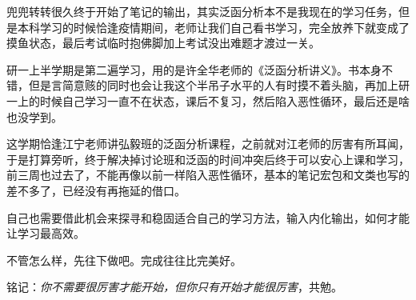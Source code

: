 \documentclass{../xdyy-notes}
\begin{document}
\maketitle

\frontmatter

\begin{preface}
  兜兜转转很久终于开始了笔记的输出，其实泛函分析本不是我现在的学习任务，但是本科学习的时候恰逢疫情期间，老师让我们自己看书学习，完全放养下就变成了摸鱼状态，最后考试临时抱佛脚加上考试没出难题才渡过一关。

  研一上半学期是第二遍学习，用的是许全华老师的《泛函分析讲义》。书本身不错，但是言简意赅的同时也会让我这个半吊子水平的人有时摸不着头脑，再加上研一上的时候自己学习一直不在状态，课后不复习，然后陷入恶性循环，最后还是啥也没学到。

  这学期恰逢江宁老师讲弘毅班的泛函分析课程，之前就对江老师的厉害有所耳闻，于是打算旁听，终于解决掉讨论班和泛函的时间冲突后终于可以安心上课和学习，前三周也过去了，不能再像以前一样陷入恶性循环，基本的笔记宏包和文类也写的差不多了，已经没有再拖延的借口。

  自己也需要借此机会来探寻和稳固适合自己的学习方法，输入内化输出，如何才能让学习最高效。

  不管怎么样，先往下做吧。完成往往比完美好。

  铭记：\emph{你不需要很厉害才能开始，但你只有开始才能很厉害}，共勉。
\end{preface}

\tableofcontents

\mainmatter


\backmatter




\end{document}
